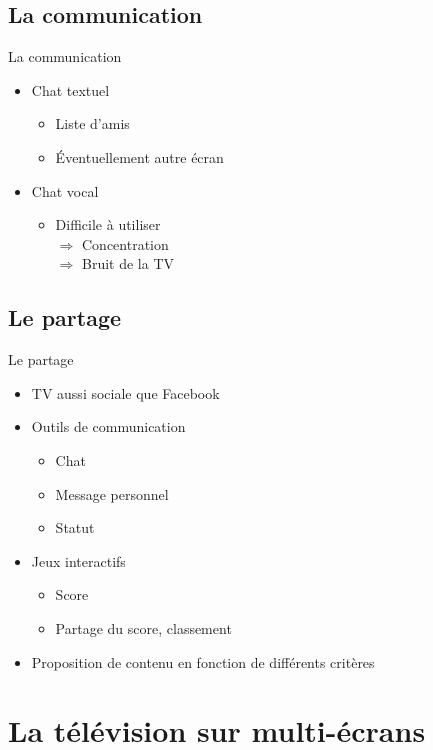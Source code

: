 \documentclass{beamer}
\begin{document}
	\subsection{La communication}
	\begin{frame}{La communication}
\begin{itemize}
	\item Chat textuel
		\begin{itemize}
			\item Liste d'amis
			\item Éventuellement autre écran
		\end{itemize}
		\vfill
		\pause
	\item Chat vocal
		\begin{itemize}
			\item Difficile à utiliser \\
				$\Rightarrow$ Concentration\\
				$\Rightarrow$ Bruit de la TV
		\end{itemize}
		\vfill
\end{itemize}
	\end{frame}
	\subsection{Le partage}
	\begin{frame}{Le partage}
	\begin{itemize}
		\item TV aussi sociale que Facebook
			\vfill
		\pause
		\item Outils de communication
			\begin{itemize}
				\item Chat
				\item Message personnel
				\item Statut
			\end{itemize}
			\vfill
		\pause
		\item Jeux interactifs
			\begin{itemize}
				\item Score
				\item Partage du score, classement
			\end{itemize}
			\vfill
		\pause
		\item Proposition de contenu en fonction de différents critères
			\vfill
	\end{itemize}
\end{frame}
	\section{La télévision sur multi-écrans}
\end{document}
